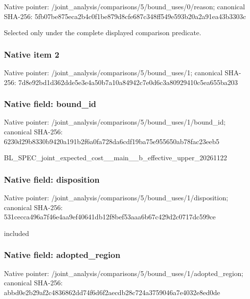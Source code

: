 \documentclass[10pt,a4paper]{article}
\begin{document}
Native pointer: /joint\_analysis/comparis\allowbreak{}ons/5/bound\_uses/0/reaso\allowbreak{}n; canonical SHA-256: 5fb07be875eca2b4c0f1be87\allowbreak{}9d8cfe687c348ff549e593b2\allowbreak{}0a2a91ea43b3303c


Selected only under the complete displayed comparison predicate.


\subsubsection{Native item 2}


Native pointer: /joint\_analysis/comparis\allowbreak{}ons/5/bound\_uses/1; canonical SHA-256: 7d8e92bd1d362dde5e3e4a50\allowbreak{}b7a10a84942c7e0d6c3a8092\allowbreak{}9410c5ea655ba203



\subsubsection{Native field: bound\_id}


Native pointer: /joint\_analysis/comparis\allowbreak{}ons/5/bound\_uses/1/bound\allowbreak{}\_id; canonical SHA-256: 6230d29b8330b9420a191b2f\allowbreak{}6a0fa728da6cdf19ba75e955\allowbreak{}650ab78fac23eeb5


BL\_SPEC\_joint\_expected\_c\allowbreak{}ost\_\_main\_\_b\_effective\_u\allowbreak{}pper\_20261122


\subsubsection{Native field: disposition}


Native pointer: /joint\_analysis/comparis\allowbreak{}ons/5/bound\_uses/1/dispo\allowbreak{}sition; canonical SHA-256: 531cecca496a7f46e4aa9ef4\allowbreak{}0641db12f8bef53aaa6b67c4\allowbreak{}29d2c0717dc599ce


included


\subsubsection{Native field: adopted\_region}


Native pointer: /joint\_analysis/comparis\allowbreak{}ons/5/bound\_uses/1/adopt\allowbreak{}ed\_region; canonical SHA-256: abbd0e2b29af2c4836862dd7\allowbreak{}4f6d6f2aecdb28c724a37590\allowbreak{}46a7e4032e8ed0de
\end{document}
